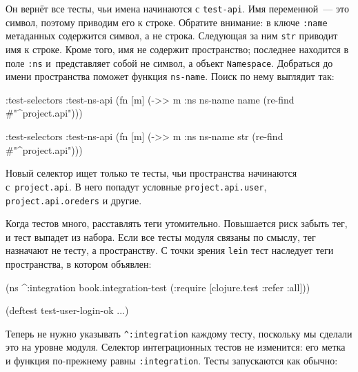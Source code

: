Он вернёт все тесты, чьи имена начинаются с \verb|test-api|. Имя переменной~---
это символ, поэтому приводим его к строке. Обратите внимание: в ключе
\verb|:name| метаданных содержится символ, а не строка. Следующая за ним
\verb|str| приводит имя к строке. Кроме того, имя не содержит пространство;
последнее находится в поле \verb|:ns| и~представляет собой не символ, а объект
\verb|Namespace|. Добраться до имени пространства поможет функция
\verb|ns-name|. Поиск по нему выглядит так:


\ifx\DEVICETYPE\MOBILE

\begin{english}
  \begin{clojure}
:test-selectors
  {:test-ns-api
   (fn [m]
     (->> m :ns ns-name name
          (re-find #"^project.api")))}
  \end{clojure}
\end{english}

\else

\begin{english}
  \begin{clojure}
:test-selectors
  {:test-ns-api
    (fn [m] (->> m :ns ns-name str
                 (re-find #"^project.api")))}
  \end{clojure}
\end{english}

\fi

Новый селектор ищет только те тесты, чьи пространства начинаются
с~\verb|project.api|. В него попадут условные \verb|project.api.user|,
\verb|project.api.oreders| и другие.

Когда тестов много, расставлять теги утомительно. Повышается риск забыть тег, и
тест выпадет из набора. Если все тесты модуля связаны по смыслу, тег назначают
не тесту, а пространству. С точки зрения \verb|lein| тест наследует теги
пространства, в котором объявлен:

\begin{english}
  \begin{clojure}
(ns ^:integration
  book.integration-test
  (:require [clojure.test :refer :all]))

(deftest test-user-login-ok
  ...)
  \end{clojure}
\end{english}

Теперь не нужно указывать \verb|^:integration| каждому тесту, поскольку мы
сделали это на уровне модуля. Селектор интеграционных тестов не изменится: его
метка и функция по-прежнему равны \verb|:integration|. Тесты запускаются как
обычно:


